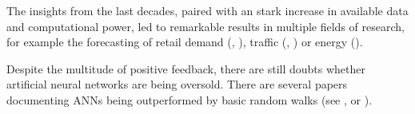 The insights from the last decades, paired with an stark increase in available data and computational power, led to remarkable results in multiple fields of research, for example the forecasting of retail demand (\citet{wen2017multi}, \citet{salinas2020deepar}), traffic (\citet{laptev2017time}, \citet{li2017diffusion}) or energy (\citet{dimoulkas2019neural}).

Despite the multitude of positive feedback, there are still doubts whether artificial neural networks are being oversold. There are several papers documenting ANNs being outperformed by basic random walks (see \citet{conejo2005forecasting}, or \citet{tkacz2001neural}). 




































